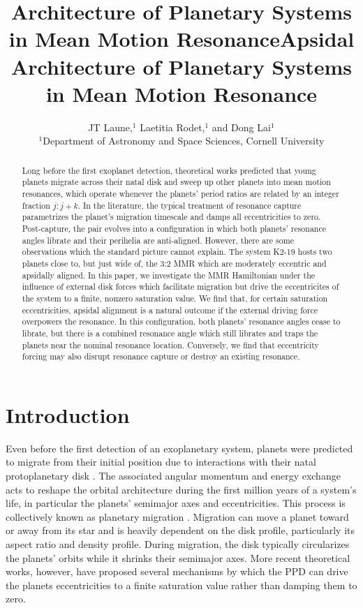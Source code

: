 \documentclass[usenatbib,twocolumn]{mnras}
\title[MMR Architecture]{Architecture of Planetary Systems in Mean Motion Resonance}
\author[Laune et al.]{
JT Laune,$^{1}$
Laetitia Rodet,$^{1}$
and Dong Lai$^{1}$
\\
$^{1}$Department of Astronomy and Space Sciences, Cornell University\\}
\date{}
\title{Apsidal Architecture of Planetary Systems in Mean Motion Resonance}
\begin{document}
\maketitle
\begin{abstract} Long before the first exoplanet detection,
theoretical works predicted that young planets migrate across their
natal disk and sweep up other planets into mean motion resonances,
which operate whenever the planets' period ratios are related by an
integer fraction $j:j+k$.  In the literature, the typical treatment of
resonance capture parametrizes the planet's migration timescale and
damps all eccentricities to zero.  Post-capture, the pair evolves into
a configuration in which both planets' resonance angles librate and
their perihelia are anti-aligned.  However, there are some
observations which the standard picture cannot explain. The system
K2-19 hosts two planets close to, but just wide of, the 3:2 MMR which
are moderately eccentric and apsidally aligned.  In this paper, we
investigate the MMR Hamiltonian under the influence of external disk
forces which facilitate migration but drive the eccentricites of the
system to a finite, nonzero saturation value.  We find that, for
certain saturation eccentricities, apsidal alignment is a natural
outcome if the external driving force overpowers the resonance.  In
this configuration, both planets' resonance angles cease to librate, but
there is a combined resonance angle which still librates and traps the
planets near the nominal resonance location.  Conversely, we find that
eccentricity forcing may also disrupt resonance capture or destroy an
existing resonance.
\end{abstract}

\section{Introduction}
\label{sec:orgfc924d7}
Even before the first detection of an exoplanetary system, planets
were predicted to migrate from their initial position due to
interactions with their natal protoplanetary disk
\citep[PPD, ][]{lin79_tidal_torques_accret_discs_binar,goldreich_excitation_1979,goldreich_disk-satellite_1980-1,moutamid14_coupl_between_corot_lindb_reson}.
The associated angular momentum and energy exchange acts to reshape
the orbital architecture during the first million years of a system's
life, in particular the planets' semimajor axes and eccentricities.
This process is collectively known as planetary migration
\citep{nelson_planetary_2018}.  Migration can move a planet toward or
away from its star and is heavily dependent on the disk profile,
particularly its aspect ratio and density profile.  During migration,
the disk typically circularizes the planets' orbits while it shrinks
their semimajor axes.  More recent theoretical works, however, have
proposed several mechanisms by which the PPD can drive the planets
eccentricities to a finite saturation value rather than damping them
to zero.
\end{document}
